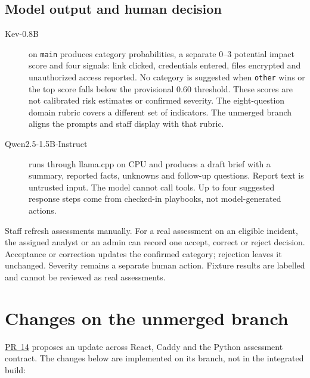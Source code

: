 \documentclass[11pt,a4paper]{article}
\newcommand{\project}{https://github.com/bekadoux/cyberguard}
\newcommand{\code}[1]{\texttt{#1}}
\begin{document}
\subsection{Model output and human decision}

\begin{description}
  \item[Kev-0.8B] on \code{main} produces category probabilities, a separate
    0--3 potential impact score and four signals: link clicked, credentials entered,
    files encrypted and unauthorized access reported. No category is
    suggested when \code{other} wins or the top score falls below the
    provisional 0.60 threshold. These scores are not calibrated risk
    estimates or confirmed severity. The eight-question domain rubric
    covers a different set of indicators. The unmerged branch aligns the
    prompts and staff display with that rubric.
  \item[Qwen2.5-1.5B-Instruct] runs through llama.cpp on CPU and produces a
    draft brief with a summary, reported facts, unknowns and follow-up
    questions. Report text is untrusted input. The model cannot call tools.
    Up to four suggested response steps come from checked-in playbooks,
    not model-generated actions.
\end{description}

Staff refresh assessments manually. For a real assessment on an eligible
incident, the assigned analyst or an admin can record one accept, correct
or reject decision. Acceptance or correction updates the confirmed
category; rejection leaves it unchanged. Severity remains a separate
human action. Fixture results are labelled and cannot be reviewed as real
assessments.

\section{Changes on the unmerged branch}

\href{\project/pull/14}{PR~14} proposes an update across React, Caddy and the
Python assessment contract. The changes below are implemented on its
branch, not in the integrated build:
\end{document}
